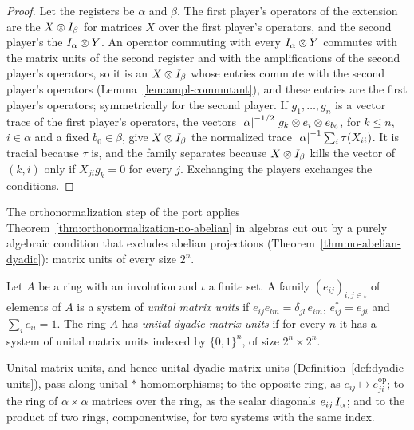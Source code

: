 \begin{proof}
\leanok
Let the registers be $\alpha$ and $\beta$. The first player's operators of the extension are the
$X \otimes I_\beta$ for matrices $X$ over the first player's operators, and the second player's
the $I_\alpha \otimes Y$. An operator commuting with every $I_\alpha \otimes Y$ commutes with the
matrix units of the second register and with the amplifications of the second player's operators,
so it is an $X \otimes I_\beta$ whose entries commute with the second player's operators
(Lemma~\ref{lem:ampl-commutant}), and these entries are the first player's operators; symmetrically
for the second player. If $g_1, \dots, g_n$ is a vector trace of the first player's operators, the
vectors $\left\vert {\alpha} \right\vert^{-1/2}\, g_k \otimes e_i \otimes e_{b_0}$, for $k \leq n$, $i \in \alpha$ and a
fixed $b_0 \in \beta$, give $X \otimes I_\beta$ the normalized trace $\left\vert {\alpha} \right\vert^{-1} \sum_i
\tau(X_{ii})$. It is tracial because $\tau$ is, and the family separates because $X \otimes
I_\beta$ kills the vector of $(k, i)$ only if $X_{ji} g_k = 0$ for every $j$. Exchanging the
players exchanges the conditions.
\end{proof}

The orthonormalization step of the port applies
Theorem~\ref{thm:orthonormalization-no-abelian} in algebras cut out by a purely algebraic
condition that excludes abelian projections (Theorem~\ref{thm:no-abelian-dyadic}): matrix units of
every size $2^n$.

\begin{definition}
\label{def:dyadic-units}
\leanok
Let $A$ be a ring with an involution and $\iota$ a finite set. A family $(e_{ij})_{i, j \in \iota}$
of elements of $A$ is a system of \emph{unital matrix units} if $e_{ij} e_{lm} = \delta_{jl}\,
e_{im}$, $e_{ij}^* = e_{ji}$ and $\sum_i e_{ii} = 1$. The ring $A$ has \emph{unital dyadic matrix
units} if for every $n$ it has a system of unital matrix units indexed by $\{0, 1\}^n$, of size
$2^n \times 2^n$.
\end{definition}

\begin{lemma}
\label{lem:dyadic-units-closure}
\leanok
Unital matrix units, and hence unital dyadic matrix units (Definition~\ref{def:dyadic-units}), pass
along unital $*$-homomorphisms; to the opposite ring, as $e_{ij} \mapsto e_{ji}^{\mathrm{op}}$; to the
ring of $\alpha \times \alpha$ matrices over the ring, as the scalar diagonals $e_{ij}\, I_\alpha$;
and to the product of two rings, componentwise, for two systems with the same index.
\end{lemma}

